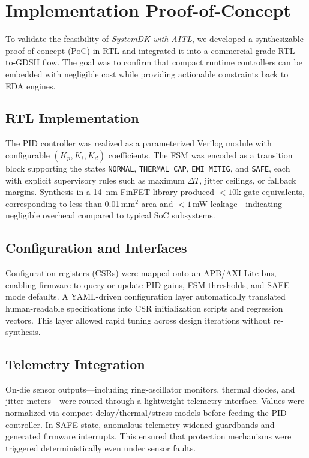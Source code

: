 \documentclass[conference]{IEEEtran}
\begin{document}
\section{Implementation Proof-of-Concept}

To validate the feasibility of \emph{SystemDK with AITL}, we developed a synthesizable proof-of-concept (PoC) in RTL and integrated it into a commercial-grade RTL-to-GDSII flow. The goal was to confirm that compact runtime controllers can be embedded with negligible cost while providing actionable constraints back to EDA engines.

\subsection{RTL Implementation}
The PID controller was realized as a parameterized Verilog module with configurable $(K_p,K_i,K_d)$ coefficients. The FSM was encoded as a transition block supporting the states \texttt{NORMAL}, \texttt{THERMAL\_CAP}, \texttt{EMI\_MITIG}, and \texttt{SAFE}, each with explicit supervisory rules such as maximum $\Delta T$, jitter ceilings, or fallback margins.  
Synthesis in a \SI{14}{\nano\meter} FinFET library produced $<10$k gate equivalents, corresponding to less than 0.01\,mm$^2$ area and $<1$\,mW leakage—indicating negligible overhead compared to typical SoC subsystems.

\subsection{Configuration and Interfaces}
Configuration registers (CSRs) were mapped onto an APB/AXI-Lite bus, enabling firmware to query or update PID gains, FSM thresholds, and SAFE-mode defaults. A YAML-driven configuration layer automatically translated human-readable specifications into CSR initialization scripts and regression vectors. This layer allowed rapid tuning across design iterations without re-synthesis.

\subsection{Telemetry Integration}
On-die sensor outputs—including ring-oscillator monitors, thermal diodes, and jitter meters—were routed through a lightweight telemetry interface. Values were normalized via compact delay/thermal/stress models before feeding the PID controller. In SAFE state, anomalous telemetry widened guardbands and generated firmware interrupts. This ensured that protection mechanisms were triggered deterministically even under sensor faults.
\end{document}
